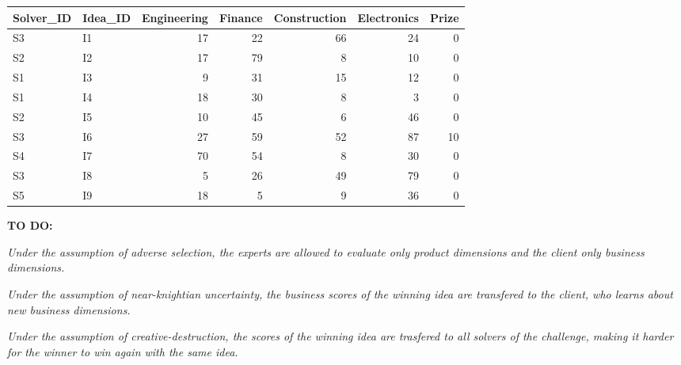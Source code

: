 \documentclass[]{elsarticle} %
\begin{document}
\begin{tabular}{l|l|r|r|r|r|r}
\hline
Solver\_ID & Idea\_ID & Engineering & Finance & Construction & Electronics & Prize\\
\hline
S3 & I1 & 17 & 22 & 66 & 24 & 0\\
\hline
S2 & I2 & 17 & 79 & 8 & 10 & 0\\
\hline
S1 & I3 & 9 & 31 & 15 & 12 & 0\\
\hline
S1 & I4 & 18 & 30 & 8 & 3 & 0\\
\hline
S2 & I5 & 10 & 45 & 6 & 46 & 0\\
\hline
S3 & I6 & 27 & 59 & 52 & 87 & 10\\
\hline
S4 & I7 & 70 & 54 & 8 & 30 & 0\\
\hline
S3 & I8 & 5 & 26 & 49 & 79 & 0\\
\hline
S5 & I9 & 18 & 5 & 9 & 36 & 0\\
\hline
\end{tabular}

\textbf{TO DO:}

\emph{Under the assumption of adverse selection, the experts are allowed
to evaluate only product dimensions and the client only business
dimensions.}

\emph{Under the assumption of near-knightian uncertainty, the business
scores of the winning idea are transfered to the client, who learns
about new business dimensions.}

\emph{Under the assumption of creative-destruction, the scores of the
winning idea are trasfered to all solvers of the challenge, making it
harder for the winner to win again with the same idea.}
\end{document}
